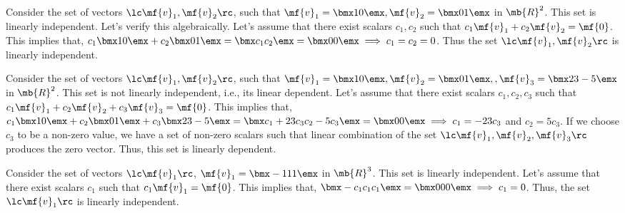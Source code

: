 \begin{boxedstuff}
    \begin{example}
        Consider the set of vectors $\lc \mf{v}_1, \mf{v}_2 \rc$, such that $\mf{v}_1 = \bmx 1 \\ 0 \emx, \mf{v}_2 = \bmx 0 \\ 1 \emx$ in $\mb{R}^2$. This set is linearly independent. Let's verify this algebraically. Let's assume that there exist scalars $c_1, c_2$ such that $c_1 \mf{v}_1 + c_2 \mf{v}_2 = \mf{0}$. This implies that, $c_1 \bmx 1 \\ 0 \emx + c_2 \bmx 0 \\ 1 \emx = \bmx c_1 \\ c_2 \emx = \bmx 0 \\ 0 \emx \implies c_1 = c_2 = 0$. Thus the set $\lc \mf{v}_1, \mf{v}_2 \rc$ is linearly independent. 
    \end{example}

    \begin{example}
        Consider the set of vectors $\lc \mf{v}_1, \mf{v}_2 \rc$, such that $\mf{v}_1 = \bmx 1 \\ 0 \emx, \mf{v}_2 = \bmx 0 \\ 1 \emx, , \mf{v}_3 = \bmx 23 \\ -5 \emx$ in $\mb{R}^2$. This set is not linearly independent, i.e., its linear dependent. Let's assume that there exist scalars $c_1, c_2, c_3$ such that $c_1 \mf{v}_1 + c_2 \mf{v}_2 + c_3 \mf{v}_3 = \mf{0}$. This implies that, $c_1 \bmx 1 \\ 0 \emx + c_2 \bmx 0 \\ 1 \emx + c_3 \bmx 23 \\ -5 \emx = \bmx c_1 + 23c_3\\ c_2  - 5 c_3 \emx = \bmx 0 \\ 0 \emx \implies c_1 = -23c_3$ and $c_2 = 5c_3$. If we choose $c_3$ to be a non-zero value, we have a set of non-zero scalars such that linear combination of the set $\lc \mf{v}_1, \mf{v}_2, \mf{v}_3 \rc$ produces the zero vector. Thus, this set is linearly dependent.
    \end{example}

    \begin{example}
        Consider the set of vectors $\lc \mf{v}_1 \rc$, $\mf{v}_1 = \bmx -1 \\ 1 \\ 1 \emx$ in $\mb{R}^3$. This set is linearly independent. Let's assume that there exist scalars $c_1$ such that $c_1 \mf{v}_1 = \mf{0}$. This implies that, $\bmx -c_1 \\ c_1 \\ c_1 \emx = \bmx 0 \\ 0 \\ 0 \emx \implies c_1 = 0$. Thus, the set $\lc \mf{v}_1 \rc$ is linearly independent.
    \end{example}


\end{boxedstuff}
